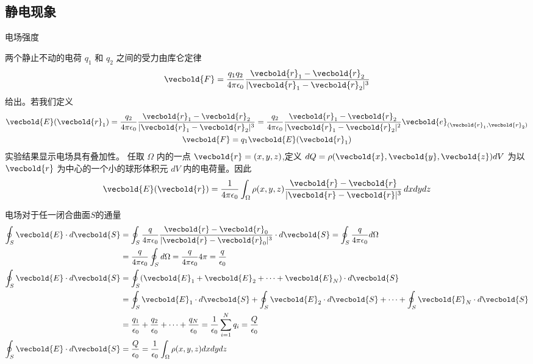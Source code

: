 \subsection{静电现象}
\begin{defn}
    电场强度

    两个静止不动的电荷 \( q_1 \) 和 \( q_2 \) 之间的受力由库仑定律
    \[
    \vecbold{F} = \frac{q_1 q_2}{4 \pi \epsilon_0} \frac{\vecbold{r}_1 - \vecbold{r}_2}{|\vecbold{r}_1 - \vecbold{r}_2|^3}
    \]
给出。若我们定义
\begin{gather*}
        \vecbold{E}(\vecbold{r}_1) = \frac{q_2}{4 \pi \epsilon_0} \frac{\vecbold{r}_1 - \vecbold{r}_2}{|\vecbold{r}_1 - \vecbold{r}_2|^3}
        =\frac{q_2}{4 \pi \epsilon_0} \frac{\vecbold{r}_1 - \vecbold{r}_2}{|\vecbold{r}_1 - \vecbold{r}_2|^2}\vecbold{e}_{(\vecbold{r}_1,\vecbold{r}_2)}\\
        \vecbold{F} = q_1 \vecbold{E}(\vecbold{r}_1)
\end{gather*}
实验结果显示电场具有叠加性。
任取 \(\Omega\) 内的一点 \(\vecbold{r} = (x,y,z)\),定义 \(dQ = \rho(\vecbold{x}, \vecbold{y}, \vecbold{z}) dV\) 
为以 \(\vecbold{r}\) 为中心的一个小的球形体积元 \(dV\) 内的电荷量。因此
\[
\vecbold{E}(\vecbold{r}) = \frac{1}{4\pi\epsilon_0}\int_{\Omega}\rho(x,y,z)\frac{\vecbold{r} - \vecbold{r}}{|\vecbold{r} - \vecbold{r}|^3}\,dxdydz
\]
\end{defn}
\begin{defn}
    电场对于任一闭合曲面\(S\)的通量
\begin{align*}
    \oint_S \vecbold{E} \cdot d\vecbold{S} 
    &= \oint_S \frac{q}{4\pi \epsilon_0} \frac{\vecbold{r} - \vecbold{r}_0}{|\vecbold{r} 
    - \vecbold{r}_0|^3} \cdot d\vecbold{S} 
    = \oint_S \frac{q}{4\pi \epsilon_0} d\Omega\\
    &= \frac{q}{4\pi \epsilon_0} \oint_S d\Omega 
    = \frac{q}{4\pi \epsilon_0} 4\pi = \frac{q}{\epsilon_0}\\
\oint_S \vecbold{E} \cdot d\vecbold{S} 
&= \oint_S (\vecbold{E}_1 + \vecbold{E}_2 + \cdots + \vecbold{E}_N) \cdot d\vecbold{S}\\
&= \oint_S \vecbold{E}_1 \cdot d\vecbold{S} 
+ \oint_S \vecbold{E}_2 \cdot d\vecbold{S} 
+ \cdots + \oint_S \vecbold{E}_N \cdot d\vecbold{S}\\
&= \frac{q_1}{\epsilon_0} + \frac{q_2}{\epsilon_0} 
+ \cdots + \frac{q_N}{\epsilon_0} 
= \frac{1}{\epsilon_0} \sum_{i=1}^N q_i = \frac{Q}{\epsilon_0}\\
\oint_S \vecbold{E} \cdot d\vecbold{S} &= \frac{Q}{\epsilon_0} 
= \frac{1}{\epsilon_0} \int_{\Omega} \rho(x, y, z) dx dy dz
\end{align*}
\end{defn}
